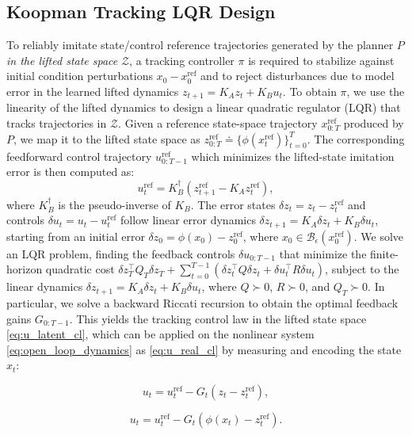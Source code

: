 \documentclass{l4dc2026}
\begin{document}
\subsection{Koopman Tracking LQR Design}
\label{sec:controller_design}
To reliably imitate state/control reference trajectories generated by the planner $P$ \textit{in the lifted state space} $\mathcal{Z}$, a tracking controller $\pi$ is required to stabilize against initial condition perturbations $x_0 - x_0^\textrm{ref}$ and to reject disturbances due to model error in the learned lifted dynamics $z_{t+1} = K_{A} z_t + K_{B} u_t$. To obtain $\pi$, we use the linearity of the lifted dynamics to design a linear quadratic regulator (LQR) that tracks trajectories in $\mathcal{Z}$. Given a reference state-space trajectory $x_{0:T}^{\text{ref}}$ produced by $P$, we map it to the lifted state space as $z_{0:T}^{\text{ref}} \doteq \{\phi(x_t^{\text{ref}})\}_{t=0}^T$. The corresponding feedforward control trajectory $u_{0:T-1}^{\text{ref}}$ which minimizes the lifted-state imitation error is then computed as:
\begin{equation}
\label{eq:u_ff}
u_{t}^{\text{ref}} = K_{B}^{\dagger} (z_{t+1}^{\text{ref}} - K_{A} z_{t}^{\text{ref}}),
\end{equation}
where $K_{B}^{\dagger}$ is the pseudo-inverse of $K_{B}$. The error states $\delta z_{t} = z_{t} - z^{\text{ref}}_{t}$ and controls $\delta u_{t} = u_{t} - u^{\text{ref}}_{t}$ follow linear error dynamics $\delta z_{t+1} = K_{A} \delta z_{t} + K_{B} \delta u_{t}$, starting from an initial error $\delta z_0 = \phi(x_0) - z^{\text{ref}}_0$, where $x_0 \in \mathcal{B}_{\epsilon}(x_{0}^{\text{ref}})$. 
We solve an LQR problem, finding the feedback controls $\delta u_{0:T-1}$ that minimize the finite-horizon quadratic cost $\delta z_T^\top Q_T \delta z_T + \sum_{t=0}^{T-1} (\delta z_t^\top Q \delta z_t + \delta u_t^\top R \delta u_t)$, subject to the linear dynamics $\delta z_{t+1} = K_{A} \delta z_t + K_{B} \delta u_t$, where $Q \succ 0$, $R \succ 0$, and $Q_T \succ 0$. In particular, we solve a backward Riccati recursion to obtain the optimal feedback gains $G_{0:T-1}$. This yields the tracking control law in the lifted state space \eqref{eq:u_latent_cl}, which can be applied on the nonlinear system \eqref{eq:open_loop_dynamics} as \eqref{eq:u_real_cl} by measuring and encoding the state $x_t$:

\begin{minipage}{0.48\textwidth}
\begin{equation}
\label{eq:u_latent_cl}
u_t = u^{\text{ref}}_t - G_t (z_t - z^{\text{ref}}_t),
\end{equation}
\end{minipage}
\hfill
\begin{minipage}{0.48\textwidth}
\begin{equation}
\label{eq:u_real_cl}
u_t = u^{\text{ref}}_t - G_t (\phi(x_t) - z^{\text{ref}}_t).
\end{equation}
\end{minipage}
\end{document}
